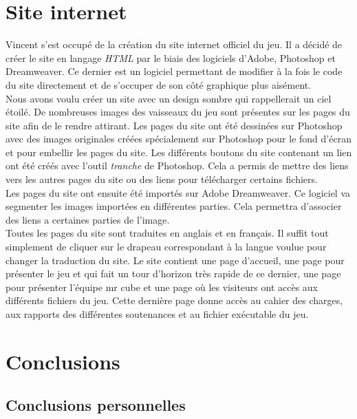 \documentclass[12pt, titlepage]{article}
\begin{document}
\begin{spacing}{1.5}
\section{Site internet}

Vincent s'est occupé de la création du site internet officiel du jeu. Il a décidé de créer le site en langage \textit{HTML} par le biais des logiciels d'Adobe, Photoshop et Dreamweaver. Ce dernier est un logiciel permettant de modifier à la fois le code du site directement et de s'occuper de son côté graphique plus aisément.\\

Nous avons voulu créer un site avec un design sombre qui rappellerait un ciel étoilé. De nombreuses images des vaisseaux du jeu sont présentes sur les pages du site afin de le rendre attirant. Les pages du site ont été dessinées sur Photoshop avec des images originales créées spécialement sur Photoshop pour le fond d'écran et pour embellir les pages du site. Les différents boutons du site contenant un lien ont été créés avec l’outil \textit{tranche} de Photoshop. Cela a permis de mettre des liens vers les autres pages du site ou des liens pour télécharger certains fichiers.\\

Les pages du site ont ensuite été importés sur  Adobe Dreamweaver. Ce logiciel va segmenter les images importées en différentes parties. Cela permettra d’associer des liens a certaines parties de l’image.\\ 

Toutes les pages du site sont traduites en anglais et en français. Il suffit tout simplement de cliquer sur le drapeau correspondant à la langue voulue pour changer la traduction du site. Le site contient une page d'accueil, une page pour présenter le jeu et qui fait un tour d’horizon très rapide de ce dernier, une page pour présenter l'équipe mr cube et une page où les visiteurs ont accès aux différents fichiers du jeu. Cette dernière page donne accès au cahier des charges, aux rapports des différentes soutenances et au fichier exécutable du jeu.\\

\newpage
\section*{Conclusions}

\subsection{Conclusions personnelles}


\end{spacing}
\end{document}
